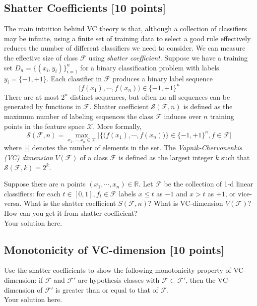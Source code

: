 \documentclass[a4paper]{article}
\theoremstyle{definition}
\newcommand{\R}{\mathbb R}
\begin{document}
\subsection{Shatter Coefficients [10 points]}
	The main intuition behind VC theory is that, although a collection of classifiers may be infinite, using a finite set of training data to select a good rule effectively reduces the number of different classifiers we need to consider. We can measure the effective size of class $\mathcal{F}$ using \textit{shatter coefficient}. Suppose we have a training set $D_n = \{(x_i, y_i)\}_{i=1}^n$ for a binary classification problem with labels $y_i = \{-1, +1\}$. Each classifier in $\mathcal{F}$ produces a binary label sequence
	$$\big(f(x_1), \cdots, f(x_n)\big) \in \{-1, +1\}^n$$
	There are at most $2^n$ distinct sequences, but often no all sequences can be generated by functions in $\mathcal{F}$. Shatter coefficient $\mathcal{S}(\mathcal{F}, n)$ is defined as the maximum number of labeling sequences the class $\mathcal{F}$ induces over $n$ training points in the feature space $\mathcal{X}$. More formally, 
	$$\mathcal{S}(\mathcal{F}, n) = \max_{x_1, \cdots, x_n \in \mathcal{X}}
	\Bigg|\Big\{\big(f(x_1), \cdots, f(x_n)\big)\Big\} \in \{-1, +1\}^n, f \in \mathcal{F}\Bigg|$$
	where $|\cdot|$ denotes the number of elements in the set.
	The \textit{Vapnik-Chervonenkis (VC) dimension} $V(\mathcal{F})$ of a class $\mathcal{F}$  is defined as the largest integer $k$ such that $\mathcal{S}(\mathcal{F}, k) = 2^k$. 
	
	Suppose there are $n$ points $(x_1, \cdots, x_n)\in\R$. Let $\mathcal{F}$ be the collection of 1-d linear classifiers: for each $t\in [0, 1], f_t \in \mathcal{F}$ labels $x\leq t$ as $-1$ and $x > t$ as $+1$, or vice-versa. What is the shatter coefficient $S(\mathcal{F}, n)$? What is VC-dimension $V(\mathcal{F})$? How can you get it from shatter coefficient?\\
{\color{blue}
	Your solution here.
}

\subsection{Monotonicity of VC-dimension [10 points]}
	Use the shatter coefficients to show the following monotonicity property of VC-dimension: if $\mathcal{F}$ and $\mathcal{F}'$ are hypothesis classes with $\mathcal{F} \subset \mathcal{F}'$, then the VC-dimension of $\mathcal{F}'$ is greater than or equal to that of $\mathcal{F}$.\\
	{\color{blue}
		Your solution here.
}
\end{document}
